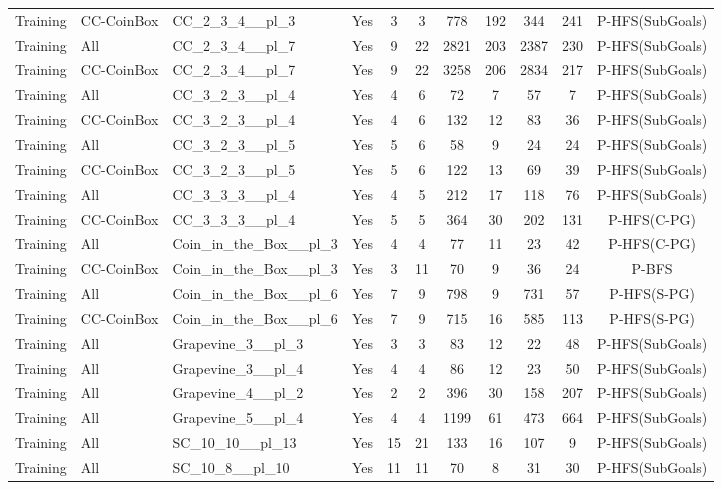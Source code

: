 \documentclass{article}
\begin{document}
\begin{tabular}{lllcccccccc}
Training & CC-CoinBox & CC\_2\_3\_4\_\_pl\_3 & Yes & 3 & 3 & 778 & 192 & 344 & 241 & P-HFS(SubGoals) \\
Training & All & CC\_2\_3\_4\_\_pl\_7 & Yes & 9 & 22 & 2821 & 203 & 2387 & 230 & P-HFS(SubGoals) \\
Training & CC-CoinBox & CC\_2\_3\_4\_\_pl\_7 & Yes & 9 & 22 & 3258 & 206 & 2834 & 217 & P-HFS(SubGoals) \\
Training & All & CC\_3\_2\_3\_\_pl\_4 & Yes & 4 & 6 & 72 & 7 & 57 & 7 & P-HFS(SubGoals) \\
Training & CC-CoinBox & CC\_3\_2\_3\_\_pl\_4 & Yes & 4 & 6 & 132 & 12 & 83 & 36 & P-HFS(SubGoals) \\
Training & All & CC\_3\_2\_3\_\_pl\_5 & Yes & 5 & 6 & 58 & 9 & 24 & 24 & P-HFS(SubGoals) \\
Training & CC-CoinBox & CC\_3\_2\_3\_\_pl\_5 & Yes & 5 & 6 & 122 & 13 & 69 & 39 & P-HFS(SubGoals) \\
Training & All & CC\_3\_3\_3\_\_pl\_4 & Yes & 4 & 5 & 212 & 17 & 118 & 76 & P-HFS(SubGoals) \\
Training & CC-CoinBox & CC\_3\_3\_3\_\_pl\_4 & Yes & 5 & 5 & 364 & 30 & 202 & 131 & P-HFS(C-PG) \\
Training & All & Coin\_in\_the\_Box\_\_pl\_3 & Yes & 4 & 4 & 77 & 11 & 23 & 42 & P-HFS(C-PG) \\
Training & CC-CoinBox & Coin\_in\_the\_Box\_\_pl\_3 & Yes & 3 & 11 & 70 & 9 & 36 & 24 & P-BFS \\
Training & All & Coin\_in\_the\_Box\_\_pl\_6 & Yes & 7 & 9 & 798 & 9 & 731 & 57 & P-HFS(S-PG) \\
Training & CC-CoinBox & Coin\_in\_the\_Box\_\_pl\_6 & Yes & 7 & 9 & 715 & 16 & 585 & 113 & P-HFS(S-PG) \\
Training & All & Grapevine\_3\_\_pl\_3 & Yes & 3 & 3 & 83 & 12 & 22 & 48 & P-HFS(SubGoals) \\
Training & All & Grapevine\_3\_\_pl\_4 & Yes & 4 & 4 & 86 & 12 & 23 & 50 & P-HFS(SubGoals) \\
Training & All & Grapevine\_4\_\_pl\_2 & Yes & 2 & 2 & 396 & 30 & 158 & 207 & P-HFS(SubGoals) \\
Training & All & Grapevine\_5\_\_pl\_4 & Yes & 4 & 4 & 1199 & 61 & 473 & 664 & P-HFS(SubGoals) \\
Training & All & SC\_10\_10\_\_pl\_13 & Yes & 15 & 21 & 133 & 16 & 107 & 9 & P-HFS(SubGoals) \\
Training & All & SC\_10\_8\_\_pl\_10 & Yes & 11 & 11 & 70 & 8 & 31 & 30 & P-HFS(SubGoals) \\

\end{tabular}
\end{document}

